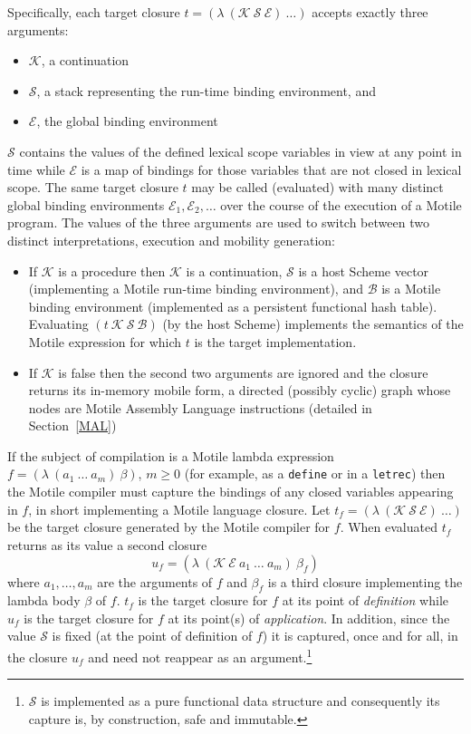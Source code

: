 \documentclass[11pt,peerreview]{IEEEtran}
\begin{document}
Specifically, each target closure $t = (\lambda\ (\mathcal{K}\ \mathcal{S}\ \mathcal{E})\ \ldots)$
accepts exactly three arguments:
\begin{itemize}
  \item $\mathcal{K}$, a continuation

  \item $\mathcal{S}$, a stack representing the run-time binding environment, and

  \item $\mathcal{E}$, the global binding environment
\end{itemize}
$\mathcal{S}$ contains the values of the defined lexical scope variables in view at any point in time while
$\mathcal{E}$ is a map of bindings for those variables that are not closed in lexical scope.
The same target closure $t$ may be called (evaluated) with many distinct global binding environments
$\mathcal{E}_1, \mathcal{E}_2, \ldots$ over the course of the execution of a Motile program.
The values of the three arguments are used to switch between two distinct interpretations, execution and mobility generation:
\begin{itemize}
  \item If $\mathcal{K}$ is a procedure then $\mathcal{K}$ is a continuation,
  $\mathcal{S}$ is a host Scheme vector (implementing a Motile run-time binding environment),
  and $\mathcal{B}$ is a Motile binding environment (implemented as a persistent functional hash table).
  Evaluating $(t\ \mathcal{K}\ \mathcal{S}\ \mathcal{B})$ (by the host Scheme) implements the semantics
  of the Motile expression for which $t$ is the target implementation. 

  \item If $\mathcal{K}$ is false then
  the second two arguments are ignored and the closure returns its in-memory mobile
  form, a directed (possibly cyclic) graph whose nodes are Motile Assembly Language instructions (detailed in Section~\ref{MAL})
\end{itemize}

If the subject of compilation is a Motile lambda expression $f = (\lambda\ (a_1\ \dots \ a_m)\ \beta)$, $m \geq 0$
(for example, as a \verb+define+ or in a \verb+letrec+) then the Motile compiler must
capture the bindings of any closed variables appearing in $f$, in short implementing a Motile language closure.
Let $t_f = (\lambda\ (\mathcal{K}\ \mathcal{S}\ \mathcal{E})\ \ldots)$
be the target closure generated by the Motile compiler for $f$.
When evaluated $t_f$ returns as its value a second closure
\[
u_f = (\lambda\ (\mathcal{K}\ \mathcal{E}\ a_1\ \dots \ a_m)\ \beta_f)
\]
where
$a_1, \dots, a_m$ are the arguments of $f$ and $\beta_f$ is a third closure implementing the lambda body
$\beta$ of $f$.
$t_f$ is the target closure for $f$ at its point of \emph{definition} while $u_f$ is the target closure for $f$ at its point(s)
of \emph{application}.
In addition, since the value $\mathcal{S}$ is fixed (at the point of definition of $f$) it is captured, once and for all,
in the closure $u_f$ and need not reappear as an argument.\footnote{
$\mathcal{S}$ is implemented as a pure functional data structure and consequently its capture is, by construction, safe
and immutable.
}
\end{document}
